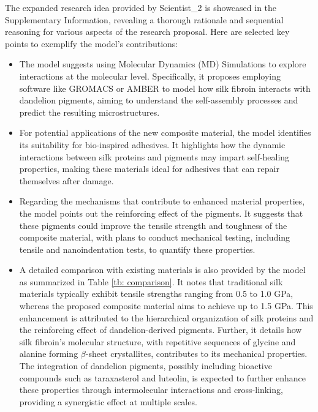 \documentclass{article}
\begin{document}
The expanded research idea provided by Scientist\_2 is showcased in the Supplementary Information, revealing a thorough rationale and sequential reasoning for various aspects of the research proposal. Here are selected key points to exemplify the model's contributions:
\begin{itemize}
    \item The model suggests using Molecular Dynamics (MD) Simulations to explore interactions at the molecular level. Specifically, it proposes employing software like GROMACS or AMBER to model how silk fibroin interacts with dandelion pigments, aiming to understand the self-assembly processes and predict the resulting microstructures.

\item For potential applications of the new composite material, the model identifies its suitability for bio-inspired adhesives. It highlights how the dynamic interactions between silk proteins and pigments may impart self-healing properties, making these materials ideal for adhesives that can repair themselves after damage.

\item Regarding the mechanisms that contribute to enhanced material properties, the model points out the reinforcing effect of the pigments. It suggests that these pigments could improve the tensile strength and toughness of the composite material, with plans to conduct mechanical testing, including tensile and nanoindentation tests, to quantify these properties.

\item A detailed comparison with existing materials is also provided by the model as summarized in Table \ref{tb: comparison}. It notes that traditional silk materials typically exhibit tensile strengths ranging from 0.5 to 1.0 GPa, whereas the proposed composite material aims to achieve up to 1.5 GPa. This enhancement is attributed to the hierarchical organization of silk proteins and the reinforcing effect of dandelion-derived pigments. Further, it details how silk fibroin’s molecular structure, with repetitive sequences of glycine and alanine forming $\beta$-sheet crystallites, contributes to its mechanical properties. The integration of dandelion pigments, possibly including bioactive compounds such as taraxasterol and luteolin, is expected to further enhance these properties through intermolecular interactions and cross-linking, providing a synergistic effect at multiple scales.


\end{itemize}
\end{document}
